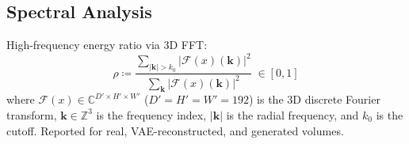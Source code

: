 \subsection{Spectral Analysis}

High-frequency energy ratio via 3D FFT:
\begin{equation}
  \rho \coloneqq \frac{\displaystyle\sum_{|\mathbf{k}|>k_0} |\mathcal{F}(x)(\mathbf{k})|^2}
              {\displaystyle\sum_{\mathbf{k}} |\mathcal{F}(x)(\mathbf{k})|^2}
    \;\in [0,1]
  \label{eq:spectral}
\end{equation}
where $\mathcal{F}(x) \in \mathbb{C}^{D' \times H' \times W'}$ ($D'{=}H'{=}W'{=}192$)
is the 3D discrete Fourier transform, $\mathbf{k} \in \mathbb{Z}^3$ is the
frequency index, $|\mathbf{k}|$ is the radial frequency, and $k_0$ is the
cutoff.  Reported for real, VAE-reconstructed, and generated volumes.
